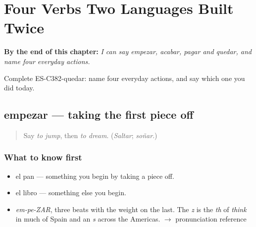 
\chapter{Four Verbs Two Languages Built Twice}
\label{ch:acabar-y-empezar}

\begin{chapteropening}
\textbf{By the end of this chapter:} \emph{I can say empezar, acabar, pagar and quedar, and name four everyday actions.}

Complete ES-C382-quedar: name four everyday actions, and say which one you did today.
\end{chapteropening}

\section[empezar]{empezar — taking the first piece off}

\label{lesson:ES-C382-empezar}



\begin{quote}
Say \emph{to jump}, then \emph{to dream}. (\emph{Saltar}; \emph{soñar}.)
\end{quote}

\subsection*{What to know first}
\begin{itemize}
\raggedright
  \item el pan — something you begin by taking a piece off.
  \item el libro — something else you begin.
\end{itemize}

\begin{sounds}
\begin{itemize}
\raggedright
  \item \emph{em-pe-ZAR}, three beats with the weight on the last. The \emph{z} is the \emph{th} of \emph{think} in much of Spain and an \emph{s} across the Americas. $\to$ pronunciation reference
\end{itemize}
\end{sounds}

